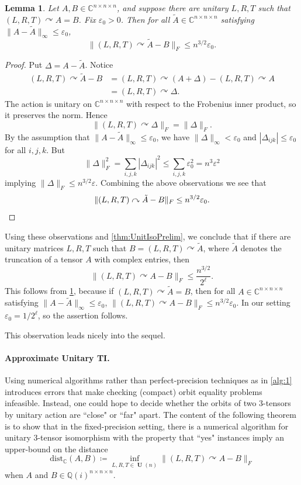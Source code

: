 \documentclass[11pt]{article}
\numberwithin{equation}{section}
\newtheorem{lemma}[theorem]{Lemma}
\theoremstyle{remark}
\DeclareMathOperator{\Unitary}{\textbf{U}}
\newcommand{\dist}{\mathrm{dist}}
\newcommand{\CC}{\mathbb{C}}
\newcommand{\QQ}{\mathbb{Q}}
\begin{document}
\begin{lemma}\label{lem:perturbedOrbit}
Let $A, B \in \CC^{n\times n \times n}$, and suppose there are unitary $L, R, T$ such that $(L, R, T) \curvearrowright A = B$. Fix $\varepsilon_0 > 0$. Then for all $\tilde{A} \in \CC^{n \times n\times n}$ satisfying $\|A - \tilde{A}\|_\infty \leq \varepsilon_0$,
\[
\|(L, R, T) \curvearrowright \tilde{A} - B\|_F \leq n^{3/2}\varepsilon_0.
\]
\end{lemma}
\begin{proof}
Put $\Delta = A - \tilde{A}$. Notice
\begin{align*}
    (L, R, T) \curvearrowright \tilde{A} - B &= (L,R,T) \curvearrowright (A + \Delta) - (L, R, T)\curvearrowright A\\
    &= (L, R, T) \curvearrowright \Delta.
\end{align*}
The action is unitary on $\CC^{n \times n \times n}$ with respect to the Frobenius inner product, so it preserves the norm. Hence
\[
\|(L, R, T) \curvearrowright \Delta\|_F = \|\Delta\|_F.
\]
By the assumption that $\|A - \tilde{A}\|_\infty \leq \varepsilon_0$, we have $\|\Delta\|_\infty < \varepsilon_0$ and $|\Delta_{ijk}|\leq \varepsilon_0$ for all $i,j,k$. But
\[
\|\Delta\|_F^2 = \sum_{i,j,k}|\Delta_{ijk}|^2 \leq \sum_{i,j,k}\varepsilon_0^2 = n^3\varepsilon^2
\]
implying $\|\Delta\|_F \leq n^{3/2}\varepsilon$. Combining the above observations we see that
\[
\|(L, R, T) \curvearrowright \tilde{A} - B\|_F \leq n^{3/2}\varepsilon_0. \qedhere
\]
\end{proof}

Using these observations and \cref{thm:UnitIsoPrelim}, we conclude that if there are unitary matrices $L, R, T$ such that $B = (L, R, T) \curvearrowright \tilde{A}$, where $\tilde{A}$ denotes the truncation of a tensor $A$ with complex entries, then
\[
    \|(L, R, T)\curvearrowright A - B\|_F \leq \frac{n^{3/2}}{2^\ell}.
\]
This follows from \cref{lem:perturbedOrbit}, because if $(L, R, T) \curvearrowright \tilde{A} = B$, then for all $A \in \CC^{n\times n \times n}$ satisfying $\|A - \tilde{A}\|_\infty \leq \varepsilon_0$, $\|(L,R,T)\curvearrowright A - B\|_F \leq n^{3/2}\varepsilon_0$. In our setting $\varepsilon_0 = 1/2^\ell$, so the assertion follows.

This observation leads nicely into the sequel.

\paragraph{Approximate Unitary TI.}
Using numerical algorithms rather than perfect-precision techniques as in \cref{alg:1} introduces errors that make checking (compact) orbit equality problems infeasible. Instead, one could hope to decide whether the orbits of two 3-tensors by unitary action are ``close" or ``far" apart.
The content of the following theorem is to show that in the fixed-precision setting, there is a numerical algorithm for unitary 3-tensor isomorphism with the property that ``yes" instances imply an upper-bound on the distance
\[
\dist_\CC(A, B) \coloneqq \inf_{L, R, T \in \Unitary(n)} \|(L, R, T) \curvearrowright A - B\|_F
\]
when $A$ and $B \in \QQ(i)^{n\times n \times n}$.
\end{document}
